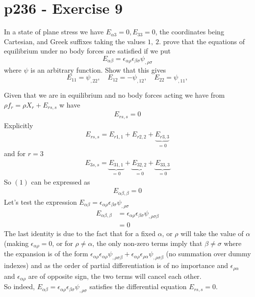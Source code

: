 \section{p236 - Exercise 9}
\begin{tcolorbox}
In a state of plane stress we have $E_{\alpha 3}=0,E_{3 3}=0$, the coordinates being Cartesian, and Greek suffixes taking the values $1,\ 2$. prove that the equations of equilibrium under no body forces are satisfied if we put
$$E_{\alpha \beta} = \epsilon_{\alpha\rho}\epsilon_{\beta \sigma} \psi_{,\rho \sigma} $$
where $\psi$ is an arbitrary function. Show that this gives $$E_{11}=\psi_{,22}, \quad E_{12}=-\psi_{,12},\quad E_{22}=\psi_{,11},$$
\end{tcolorbox}
Given that we are in equilibrium and no body forces acting we have from $\rho f_r=\rho X_r +E_{rs,s}$ w have
\begin{align}
E_{rs,s}=0
\end{align}
Explicitly
\begin{align}
E_{rs,s}=E_{r1,1}+E_{r2,2}+\underbrace{E_{r3,3}}_{=0}
\end{align}
and for $r=3$
\begin{align}
E_{3s,s}=\underbrace{E_{31,1}}_{=0}+\underbrace{E_{32,2}}_{=0}+\underbrace{E_{33,3}}_{=0}
\end{align}
So $(1)$ can be expressed as 
\begin{align}
E_{\alpha\beta,\beta}=0
\end{align}
Let's test the expression $E_{\alpha \beta} = \epsilon_{\alpha\rho}\epsilon_{\beta \sigma} \psi_{,\rho \sigma} $
\begin{align}
E_{\alpha \beta,\beta} &= \epsilon_{\alpha\rho}\epsilon_{\beta \sigma} \psi_{,\rho \sigma\beta}\\
&= 0
\end{align}
The last identity is due to the fact that for a fixed $\alpha$, or $\rho$ will take the value of $\alpha$ (making $\epsilon_{\alpha\rho}=0$, or for $\rho\ne\alpha$, the only non-zero terms imply that $\beta\ne\sigma$ where the expansion is of the form $\epsilon_{\alpha\rho}\epsilon_{\alpha\rho} \psi_{,\rho \sigma\beta}+\epsilon_{\alpha\rho}\epsilon_{\rho\alpha} \psi_{,\rho \sigma\beta}$ (no summation over dummy indexes) and as the order of partial differentiation is of no importance and $\epsilon_{\rho\alpha}$ and $\epsilon_{\alpha\rho}$ are of opposite sign, the two terms will cancel each other.\\
So indeed, $E_{\alpha \beta} = \epsilon_{\alpha\rho}\epsilon_{\beta \sigma} \psi_{,\rho \sigma} $ satisfies the differential equation $E_{rs,s}=0$.
